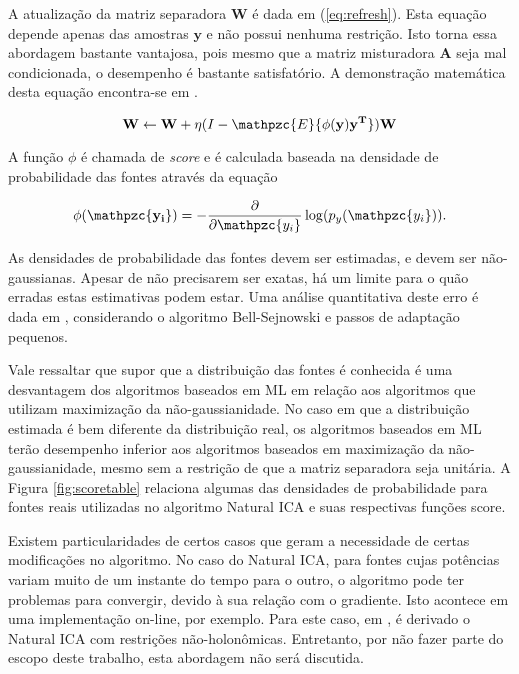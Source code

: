     A atualização da matriz separadora $\mathbf{W}$ é dada em (\ref{eq:refresh}). Esta equação depende apenas das amostras $\mathbf{y}$ e não possui nenhuma restrição. Isto torna essa abordagem bastante vantajosa, pois mesmo que a matriz misturadora $\mathbf{A}$ seja mal condicionada, o desempenho é bastante satisfatório. A demonstração matemática desta equação encontra-se em \cite{ICA3}.
    
    \begin{equation}
    \label{eq:refresh}
    \mathbf{W} \leftarrow \mathbf{W} + \eta(I - \mathpzc{E}\{\phi({\mathbf{y})\mathbf{y^T}}\})\mathbf{W}
    \end{equation}
    
    A função $\phi$ é chamada de \textit{score} e é calculada baseada na densidade de probabilidade das fontes através da equação
    
    \begin{equation}
    \label{eq:score}
    \mathbf{\phi({\mathpzc{y_i}})} = - \frac{\partial}{\partial \mathpzc{y_i}} \log(p_y(\mathpzc{y_i})).
    \end{equation}
    
    As densidades de probabilidade das fontes devem ser estimadas, e devem ser não-gaussianas. Apesar de não precisarem ser exatas, há um limite para o quão erradas estas estimativas podem estar. Uma análise quantitativa deste erro é dada em \cite{ICA3}, considerando o algoritmo Bell-Sejnowski e passos de adaptação pequenos.
    
    Vale ressaltar que supor que a distribuição das fontes é conhecida é uma desvantagem dos algoritmos baseados em ML em relação aos algoritmos que utilizam maximização da não-gaussianidade. No caso em que a distribuição estimada é bem diferente da distribuição real, os algoritmos baseados em ML terão desempenho inferior aos algoritmos baseados em maximização da não-gaussianidade, mesmo sem a restrição de que a matriz separadora seja unitária. A Figura \ref{fig:scoretable} relaciona algumas das densidades de probabilidade para fontes reais utilizadas no algoritmo Natural ICA e suas respectivas funções score.
    
    Existem particularidades de certos casos que geram a necessidade de certas modificações no algoritmo. No caso do Natural ICA, para fontes cujas potências variam muito de um instante do tempo para o outro, o algoritmo pode ter problemas para convergir, devido à sua relação com o gradiente. Isto acontece em uma implementação on-line, por exemplo. Para este caso, em \cite{holonomic}, é derivado o Natural ICA com restrições não-holonômicas. Entretanto, por não fazer parte do escopo deste trabalho, esta abordagem não será discutida.


